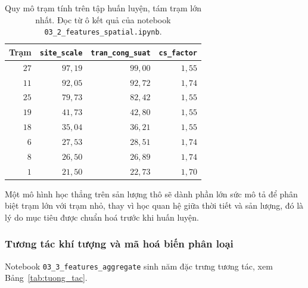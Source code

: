 \documentclass[12pt, a4paper]{report}
\begin{document}
\begin{table}[htbp]
\centering
\caption{Quy mô trạm tính trên tập huấn luyện, tám trạm lớn nhất. Đọc từ ô kết quả của
notebook \texttt{03\_2\_features\_spatial.ipynb}.}
\label{tab:quy_mo}
\small
\begin{tabular}{r r r r}
\toprule
\textbf{Trạm} & \texttt{site\_scale} & \texttt{tran\_cong\_suat} & \texttt{cs\_factor} \\
\midrule
$27$ & $97{,}19$ & $99{,}00$ & $1{,}55$ \\
$11$ & $92{,}05$ & $92{,}72$ & $1{,}74$ \\
$25$ & $79{,}73$ & $82{,}42$ & $1{,}55$ \\
$19$ & $41{,}73$ & $42{,}80$ & $1{,}55$ \\
$18$ & $35{,}04$ & $36{,}21$ & $1{,}55$ \\
$6$  & $27{,}53$ & $28{,}51$ & $1{,}74$ \\
$8$  & $26{,}50$ & $26{,}89$ & $1{,}74$ \\
$1$  & $21{,}50$ & $22{,}73$ & $1{,}70$ \\
\bottomrule
\end{tabular}
\caption[Quy mô trạm tính trên tập huấn luyện, tám trạm lớn nhất]{Quy mô trạm tính trên tập huấn luyện, tám trạm lớn nhất. Đọc từ ô kết quả của
notebook \texttt{03\_2\_features\_spatial.ipynb}.}
\label{tab:quy_mo}
\end{table}

Một mô hình học thẳng trên sản lượng thô sẽ dành phần lớn sức mô tả để phân biệt trạm lớn với trạm nhỏ, thay vì học quan hệ
giữa thời tiết và sản lượng, đó là lý do mục tiêu được chuẩn hoá trước khi huấn luyện.

\subsubsection{Tương tác khí tượng và mã hoá biến phân loại}

Notebook \texttt{03\_3\_features\_aggregate} sinh năm đặc trưng tương tác, xem
Bảng~\ref{tab:tuong_tac}.
\end{document}

